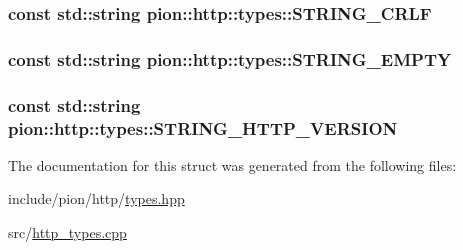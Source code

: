 \hypertarget{structpion_1_1http_1_1types_a2716c2eefa7527fd8e342f82cc45f1b8}{
\subsubsection[{S\-T\-R\-I\-N\-G\-\_\-\-C\-R\-L\-F}]{\setlength{\rightskip}{0pt plus 5cm}const std\-::string pion\-::http\-::types\-::\-S\-T\-R\-I\-N\-G\-\_\-\-C\-R\-L\-F\hspace{0.3cm}{\ttfamily [static]}}}\label{structpion_1_1http_1_1types_a2716c2eefa7527fd8e342f82cc45f1b8}
\hypertarget{structpion_1_1http_1_1types_ac329dd732e03e0a0b1651a84d629280d}{
\subsubsection[{S\-T\-R\-I\-N\-G\-\_\-\-E\-M\-P\-T\-Y}]{\setlength{\rightskip}{0pt plus 5cm}const std\-::string pion\-::http\-::types\-::\-S\-T\-R\-I\-N\-G\-\_\-\-E\-M\-P\-T\-Y\hspace{0.3cm}{\ttfamily [static]}}}\label{structpion_1_1http_1_1types_ac329dd732e03e0a0b1651a84d629280d}
\hypertarget{structpion_1_1http_1_1types_a432751abff7daf4f043a8f48a0a9e326}{
\subsubsection[{S\-T\-R\-I\-N\-G\-\_\-\-H\-T\-T\-P\-\_\-\-V\-E\-R\-S\-I\-O\-N}]{\setlength{\rightskip}{0pt plus 5cm}const std\-::string pion\-::http\-::types\-::\-S\-T\-R\-I\-N\-G\-\_\-\-H\-T\-T\-P\-\_\-\-V\-E\-R\-S\-I\-O\-N\hspace{0.3cm}{\ttfamily [static]}}}\label{structpion_1_1http_1_1types_a432751abff7daf4f043a8f48a0a9e326}


The documentation for this struct was generated from the following files\-:\begin{DoxyCompactItemize}
\item 
include/pion/http/\hyperlink{http_2types_8hpp}{types.\-hpp}\item 
src/\hyperlink{http__types_8cpp}{http\-\_\-types.\-cpp}\end{DoxyCompactItemize}
